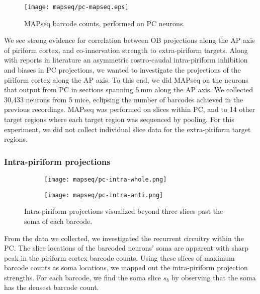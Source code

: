 \documentclass[../dissertation.tex]{subfiles}
\begin{document}
\begin{figure}[p]
    \centering
    \texttt{[image: mapseq/pc-mapseq.eps]}
    \caption{MAPseq barcode counts, performed on PC neurons.}
    \label{fig:pcmapseq}
\end{figure}

We see strong evidence for correlation between OB projections along the AP axis of piriform cortex, and co-innervation strength to extra-piriform targets.
Along with reports in literature an asymmetric rostro-caudal intra-piriform inhibition and biases in PC projections, \cite{mapseq084,mapseq085,mapseq086}
we wanted to investigate the projections of the piriform cortex along the AP axis.
To this end, we did MAPseq on the neurons that output from PC in sections spanning $\SI{5}{\mm}$ along the AP axis.
We collected 30,433 neurons from 5 mice, eclipsing the number of barcodes achieved in the previous recordings.
MAPseq was performed on slices within PC, and to 14 other target regions where each target region was sequenced by pooling.
For this experiment, we did not collect individual slice data for the extra-piriform target regions.

\subsubsection{Intra-piriform projections}

\begin{figure}[ht!]
    \centering
    \begin{subfigure}[c]{0.45\textwidth}
        \texttt{[image: mapseq/pc-intra-whole.png]}
        \label{fig:pcintra-full}
    \end{subfigure}

    \begin{subfigure}[c]{0.45\textwidth}
        \texttt{[image: mapseq/pc-intra-anti.png]}
        \label{fig:pcintra-anti}
    \end{subfigure}

\caption{Intra-piriform projections visualized beyond three slices past the soma of each barcode.}
    \label{fig:pcintra}
\end{figure}

From the data we collected, we investigated the recurrent circuitry within the PC.
The slice locations of the barcoded neurons' soma are apparent with sharp peak in the piriform cortex barcode counts.
Using these slices of maximum barcode counts as soma locations, we mapped out the intra-piriform projection strengths.
For each barcode, we find the soma slice $s_b$ by observing that the soma has the densest barcode count.
\end{document}
